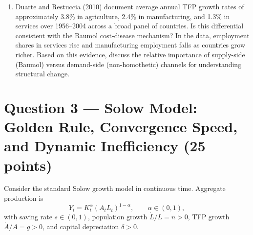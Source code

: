 \documentclass[a4paper,11pt]{article}
\begin{document}
\begin{enumerate}[label=\textbf{\arabic*.}, leftmargin=*, itemsep=6pt]
\begin{enumerate}[label=(\alph*), itemsep=4pt]
        \item Duarte and Restuccia (2010) document average annual TFP growth rates of
        approximately 3.8\% in agriculture, 2.4\% in manufacturing, and 1.3\% in services
        over 1956--2004 across a broad panel of countries.  Is this differential consistent
        with the Baumol cost-disease mechanism?  In the data, employment shares in services
        rise and manufacturing employment falls as countries grow richer.  Based on this
        evidence, discuss the relative importance of supply-side (Baumol) versus
        demand-side (non-homothetic) channels for understanding structural change.
    \end{enumerate}

\end{enumerate}

\clearpage

\section{Question 3 --- Solow Model: Golden Rule, Convergence Speed, and Dynamic Inefficiency \hfill (25 points)}

Consider the standard Solow growth model in continuous time.  Aggregate production is
\[
    Y_t = K_t^{\alpha}(A_t L_t)^{1-\alpha}, \qquad \alpha \in (0,1),
\]
with saving rate $s \in (0,1)$, population growth $\dot{L}/L = n > 0$, TFP growth
$\dot{A}/A = g > 0$, and capital depreciation $\delta > 0$.
\end{document}
